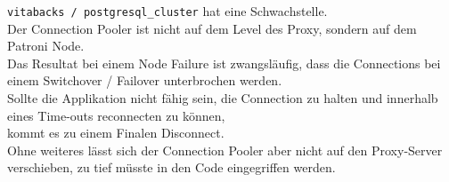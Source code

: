 \begin{flushleft}
    \texttt{vitabacks / postgresql\_cluster} hat eine Schwachstelle.\\
    Der \Gls{Connection Pooler} ist nicht auf dem Level des Proxy, sondern auf dem Patroni Node.\\
    Das Resultat bei einem Node Failure ist zwangsläufig, dass die Connections bei einem \Gls{Switchover} / \Gls{Failover} unterbrochen werden.\\
    Sollte die Applikation nicht fähig sein, die Connection zu halten und innerhalb eines Time-outs reconnecten zu können,\\
    kommt es zu einem Finalen Disconnect.\\
    Ohne weiteres lässt sich der \Gls{Connection Pooler} aber nicht auf den Proxy-Server verschieben, zu tief müsste in den Code eingegriffen werden.
\end{flushleft}